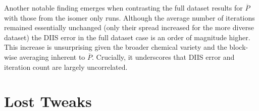 \begin{table}[H]
    \centering
    \caption[Models compared to \textsc{PySCF} and $\overline{P}$ schemes - full QM9 dataset]{Comparison of different models employing \textsc{PySCF} and $\overline{P}$ guessing schemes on the full QM9 dataset. Here, $\overline{P}$ is computed block-wise across all molecules by averaging over each , -, \dots block.
}
    \label{tab:qm9_full_test_overview}
\end{table}
Another notable finding emerges when contrasting the full dataset results for $\overline{P}$ with those from the isomer only runs. Although the average number of iterations remained essentially unchanged (only their spread increased for the more diverse dataset) the DIIS error in the full dataset case is an order of magnitude higher. This increase is unsurprising given the broader chemical variety and the block-wise averaging inherent to $\overline{P}$. Crucially, it underscores that DIIS error and iteration count are largely uncorrelated.

\section{Lost Tweaks}
\label{sec:lost_tweaks}
